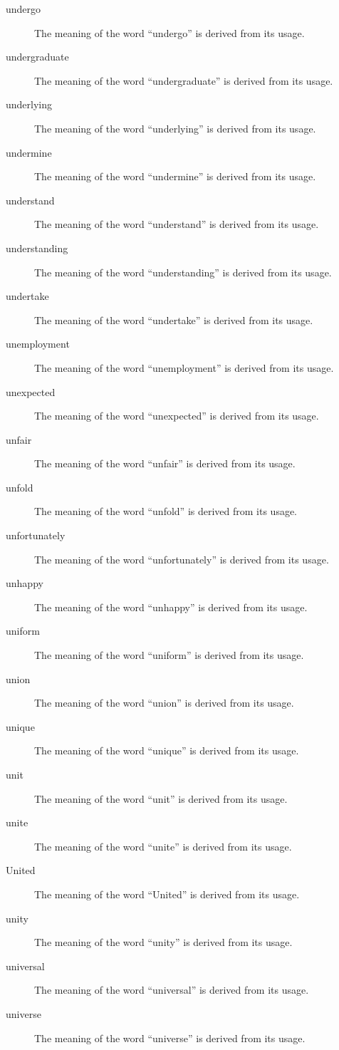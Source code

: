 \documentclass[12pt, letterpaper]{memoir}
\begin{document}
\begin{description}
\item[undergo] The meaning of the word ``undergo'' is derived from its usage.
\item[undergraduate] The meaning of the word ``undergraduate'' is derived from its usage.
\item[underlying] The meaning of the word ``underlying'' is derived from its usage.
\item[undermine] The meaning of the word ``undermine'' is derived from its usage.
\item[understand] The meaning of the word ``understand'' is derived from its usage.
\item[understanding] The meaning of the word ``understanding'' is derived from its usage.
\item[undertake] The meaning of the word ``undertake'' is derived from its usage.
\item[unemployment] The meaning of the word ``unemployment'' is derived from its usage.
\item[unexpected] The meaning of the word ``unexpected'' is derived from its usage.
\item[unfair] The meaning of the word ``unfair'' is derived from its usage.
\item[unfold] The meaning of the word ``unfold'' is derived from its usage.
\item[unfortunately] The meaning of the word ``unfortunately'' is derived from its usage.
\item[unhappy] The meaning of the word ``unhappy'' is derived from its usage.
\item[uniform] The meaning of the word ``uniform'' is derived from its usage.
\item[union] The meaning of the word ``union'' is derived from its usage.
\item[unique] The meaning of the word ``unique'' is derived from its usage.
\item[unit] The meaning of the word ``unit'' is derived from its usage.
\item[unite] The meaning of the word ``unite'' is derived from its usage.
\item[United] The meaning of the word ``United'' is derived from its usage.
\item[unity] The meaning of the word ``unity'' is derived from its usage.
\item[universal] The meaning of the word ``universal'' is derived from its usage.
\item[universe] The meaning of the word ``universe'' is derived from its usage.

\end{description}
\end{document}
